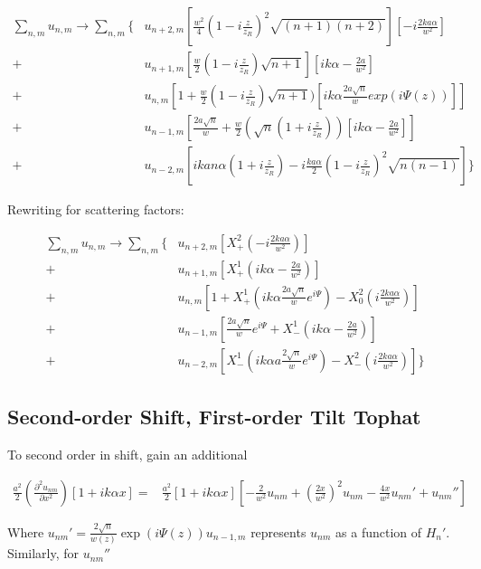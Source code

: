 \documentclass[aps,twoside,secnumarabic,balancelastpage,amsmath,amssymb,nofootinbib,hyperref=pdftex]{revtex4}
\begin{document}
\begin{align*}
\sum_{n,m} u_{n,m} \rightarrow 
	\sum_{n,m} 
	\lbrace &
		u_{n+2,m} [\frac{w^2}{4}(1-i \frac{z}{z_R})^2 \sqrt{(n+1)(n+2)} ][-i\frac{2ka\alpha}{w^2}]
		\\+&
		u_{n+1,m} [\frac{w}{2}(1-i\frac{z}{z_R})\sqrt{n+1}][ik\alpha - \frac{2a}{w^2}]
		\\+&
		u_{n,m} [1+\frac{w}{2}(1-i\frac{z}{z_R})\sqrt{n+1})[ik\alpha \frac{2a\sqrt{n}}{w} exp(i \Psi(z))]]
		\\+&
		u_{n-1,m} [\frac{2a\sqrt{n}}{w} + \frac{w}{2}(\sqrt{n}(1+i\frac{z}{z_R}))[ik\alpha - \frac{2a}{w^2}]]
		\\+&
		u_{n-2,m} [ikan\alpha(1+i\frac{z}{z_R}) - i\frac{ka\alpha}{2}
(1-i\frac{z}{z_R})^2 \sqrt{n(n-1)}		
		] 	
	\rbrace
\end{align*}

Rewriting for scattering factors:

\begin{align*}
\sum_{n,m} u_{n,m} \rightarrow 
	\sum_{n,m} 
	\lbrace &
		u_{n+2,m}[ X_+^2(-i\frac{2ka\alpha}{w^2})]
		\\+&
		u_{n+1,m}[ X_+^1(ik\alpha - \frac{2a}{w^2})]
		\\+&
		u_{n,m} [1+X_+^1(ik\alpha \frac{2a\sqrt{n}}{w} e^{i\Psi})- X_0^2 (i\frac{2ka\alpha}{w^2})]
		\\+&
		u_{n-1,m} [\frac{2a\sqrt{n}}{w} e^{i\Psi} + X_-^1(ik\alpha - \frac{2a}{w^2})]
		\\+&
		u_{n-2,m} [ X_-^1(ik\alpha a\frac{2\sqrt{n}}{w}e^{i\Psi}) - X_-^2 (i\frac{2ka\alpha}{w^2})] 	
	\rbrace
\end{align*}

\clearpage

\subsection{Second-order Shift, First-order Tilt Tophat}

To second order in shift, gain an additional

\begin{align*}
	\frac{a^2}{2} (\frac{\partial^2 u_{nm}}{\partial x^2}) [1+ik\alpha x] =&
	\frac{a^2}{2} [1+ik\alpha x] [-\frac{2}{w^2}u_{nm} + (\frac{2x}{w^2})^2 u_{nm} - \frac{4x}{w^2}u_{nm}' + u_{nm}'']
\end{align*}

Where $u_{nm}'=	\frac{2 \sqrt{n}}{w(z)} 
	\exp(i \Psi(z))
	u_{n-1,m}$ represents $u_{nm}$ as a function of $H_n'$. Similarly, for $u_{nm}''$
\end{document}

